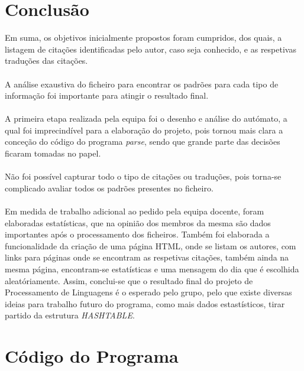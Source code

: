 \documentclass[11pt,a4paper]{report}%
\begin{document}
\chapter{Conclusão}
Em suma, os objetivos inicialmente propostos foram cumpridos, dos quais, a listagem de citações identificadas pelo autor, caso seja conhecido, e as respetivas traduções das citações.\\\\
A análise exaustiva do ficheiro para encontrar os padrões para cada tipo de informação foi importante para atingir o resultado final.\\\\
A primeira etapa realizada pela equipa foi o desenho e análise do autómato, a qual foi imprecindível para a elaboração do projeto, pois tornou mais clara a conceção do código do programa \emph{parse}, sendo que grande parte das decisões ficaram tomadas no papel.\\\\
Não foi possível capturar todo o tipo de citações ou traduções, pois torna-se complicado avaliar todos os padrões presentes no ficheiro.\\\\
Em medida de trabalho adicional ao pedido pela equipa docente, foram elaboradas estatísticas, que na opinião dos membros da mesma são dados importantes após o processamento dos ficheiros. Também foi elaborada a funcionalidade da criação de uma página HTML, onde se listam os autores, com links para páginas onde se encontram as respetivas citações, também ainda na mesma página, encontram-se estatísticas e uma mensagem do dia que é escolhida aleatóriamente.
Assim, conclui-se que o resultado final do projeto de Processamento de Linguagens é o esperado pelo grupo, pelo que existe diversas ideias para trabalho futuro do programa, como mais dados estastísticos, tirar partido da estrutura \emph{HASHTABLE}.

\appendix %
\chapter{Código do Programa}
\end{document}

